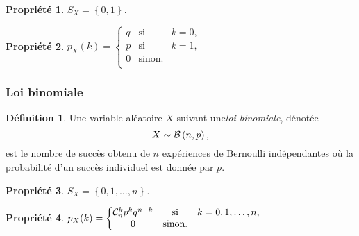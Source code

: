 \documentclass[11pt]{article}
\makeatletter
\newcommand\comb[2]{%
	\ensuremath{%
		\mathcal{C}_{#2}^{#1}%
	}%
}%
\newcommand\Bin[2]{%
	\ensuremath{%
		\mathcal{B}\left(#1,#2\right)%
	}%
}%
\newtheorem{property}{Propriété}
\theoremstyle{remark}
\theoremstyle{definition}
\newtheorem*{@definition}{Définition}
\newenvironment{definition}{%
	\begin{@definition}%
}{%
	\end{@definition}%
	\setcounter{property}{0}%
}
\makeatother
\begin{document}
\begin{property}
	$S_X=\left\{0,1\right\}$.
\end{property}

\begin{property}
	$p_X(k)=\left\{
		\begin{matrix}
			q & \text{si} & k=0,\\
			p & \text{si} & k=1,\\
			0 & \text{sinon}.\\
		\end{matrix}
	\right.$
\end{property}

\subsubsection{Loi binomiale}
\begin{definition}
	Une variable aléatoire $X$ suivant une\textit{loi binomiale}, dénotée
	\begin{equation*}
		X\sim\Bin{n}{p},
	\end{equation*}
	est le nombre de succès obtenu de $n$ expériences de Bernoulli
	indépendantes où la probabilité d'un succès individuel est donnée par $p$.
\end{definition}

\begin{property}
	$S_X=\left\{0,1,\dots,n\right\}$.
\end{property}

\begin{property}
	$p_X(k)=\left\{
		\begin{matrix}
			\comb{k}{n}p^kq^{n-k} & \text{si} & k=0,1,\dots,n,\\
			0                     & \text{sinon}.\\
		\end{matrix}
	\right.$
\end{property}
\end{document}
